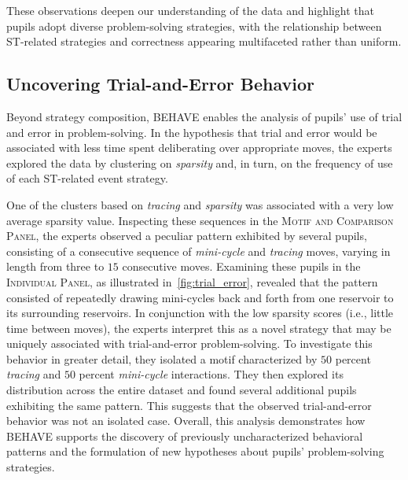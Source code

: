 \documentclass[letterpaper,journal]{IEEEtran}
\begin{document}
These observations deepen our understanding of the data and highlight that pupils adopt diverse problem-solving strategies, with the relationship between ST-related strategies and correctness appearing multifaceted rather than uniform.





\subsection{Uncovering Trial-and-Error Behavior}

Beyond strategy composition, \textsc{BEHAVE} enables the analysis of pupils' use of trial and error in problem-solving. 
In the hypothesis that trial and error would be associated with less time spent deliberating over appropriate moves, the experts explored the data by clustering on \textit{sparsity} and, in turn, on the frequency of use of each ST-related event strategy.

One of the clusters based on \textit{tracing} and \textit{sparsity} was associated with a very low average sparsity value.
Inspecting these sequences in the \textsc{Motif and Comparison Panel}, the experts observed a peculiar pattern exhibited by several pupils, consisting of a consecutive sequence of \textit{mini-cycle} and \textit{tracing} moves, varying in length from three to $15$ consecutive moves.
Examining these pupils in the \textsc{Individual Panel}, as illustrated in~\cref{fig:trial_error}, revealed that the pattern consisted of repeatedly drawing mini-cycles back and forth from one reservoir to its surrounding reservoirs.
In conjunction with the low sparsity scores (i.e., little time between moves), the experts interpret this as a novel strategy that may be uniquely associated with trial-and-error problem-solving. 
To investigate this behavior in greater detail, they isolated a motif characterized by $50$ percent \textit{tracing} and $50$ percent \textit{mini-cycle} interactions.
They then explored its distribution across the entire dataset and found several additional pupils exhibiting the same pattern.
This suggests that the observed trial-and-error behavior was not an isolated case.
Overall, this analysis demonstrates how \textsc{BEHAVE} supports the discovery of previously uncharacterized behavioral patterns and the formulation of new hypotheses about pupils' problem-solving strategies.
\end{document}

